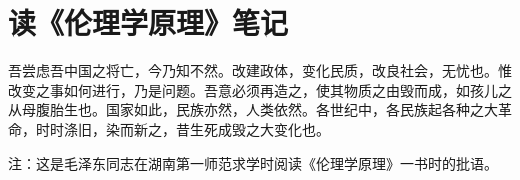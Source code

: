 \section[读《伦理学原理》笔记]{读《伦理学原理》笔记}


吾尝虑吾中国之将亡，今乃知不然。改建政体，变化民质，改良社会，无忧也。惟改变之事如何进行，乃是问题。吾意必须再造之，使其物质之由毁而成，如孩儿之从母腹胎生也。国家如此，民族亦然，人类依然。各世纪中，各民族起各种之大革命，时时涤旧，染而新之，昔生死成毁之大变化也。

注：这是毛泽东同志在湖南第一师范求学时阅读《伦理学原理》一书时的批语。

